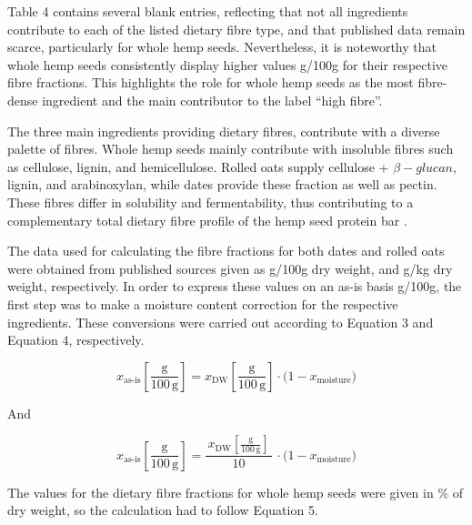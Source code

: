 \vspace{1em}
Table 4 contains several blank entries, reflecting that not all ingredients contribute to each of the listed dietary fibre type, and that published data remain scarce, particularly for whole hemp seeds. Nevertheless, it is noteworthy that whole hemp seeds consistently display higher values g/100g for their respective fibre fractions. This highlights the role for whole hemp seeds as the most fibre-dense ingredient and the main contributor to the label “high fibre”. 

\vspace{1em}
The three main ingredients providing dietary fibres, contribute with a diverse palette of fibres. Whole hemp seeds mainly contribute with insoluble fibres such as cellulose, lignin, and hemicellulose. Rolled oats supply cellulose + $\beta-glucan$, lignin, and arabinoxylan, while dates provide these fraction as well as pectin. These fibres differ in solubility and fermentability, thus contributing to a complementary total dietary fibre profile of the hemp seed protein bar \cite*{art_15_df_research}.

\vspace{1em}
The data used for calculating the fibre fractions for both dates and rolled oats were obtained from published sources given as g/100g dry weight, and g/kg dry weight, respectively. In order to express these values on an as-is basis g/100g, the first step was to make a moisture content correction for the respective ingredients. These conversions were carried out according to Equation 3 and Equation 4, respectively. 


\begin{equation}
    x_{\text{as-is}}\!\left[\frac{\mathrm{g}}{100\,\mathrm{g}}\right]
    = x_{\mathrm{DW}}\!\left[\frac{\mathrm{g}}{100\,\mathrm{g}}\right]\cdot
    \bigl(1 - x_{\text{moisture}}\bigr)
    \label{eq:asis_simple}
\end{equation}

And

\begin{equation}
    x_{\text{as-is}}\!\left[\frac{\mathrm{g}}{100\,\mathrm{g}}\right]
    = \frac{\,x_{\mathrm{DW}}\!\left[\frac{\mathrm{g}}{100\,\mathrm{g}}\right]\,}{10}\,\cdot
    \bigl(1 - x_{\text{moisture}}\bigr)
    \label{eq:asis_div10}
\end{equation}
    
The values for the dietary fibre fractions for whole hemp seeds were given in \% of dry weight, so the calculation had to follow Equation 5.     

